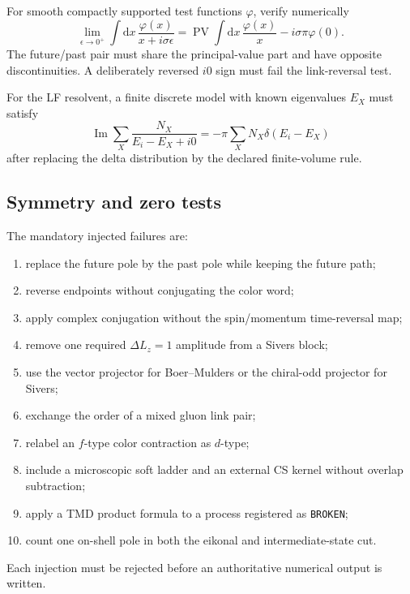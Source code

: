 \documentclass[11pt]{article}
\newcommand{\dd}{\mathrm{d}}
\newcommand{\PV}{\operatorname{PV}}
\begin{document}
For smooth compactly supported test functions \(\varphi\), verify numerically
\begin{equation}
 \lim_{\epsilon\to0^+}
 \int\dd x\,
 \frac{\varphi(x)}{x+i\sigma\epsilon}
 =\PV\int\dd x\,\frac{\varphi(x)}{x}
 -i\sigma\pi\varphi(0).
\label{eq:distribution-numerical-test}
\end{equation}
The future/past pair must share the principal-value part and have opposite
discontinuities.  A deliberately reversed \(i0\) sign must fail the
link-reversal test.

For the LF resolvent, a finite discrete model with known eigenvalues
\(E_X\) must satisfy
\begin{equation}
 \operatorname{Im}
 \sum_X\frac{N_X}{E_i-E_X+i0}
 =-\pi\sum_X N_X\delta(E_i-E_X)
\label{eq:discrete-resolvent-test}
\end{equation}
after replacing the delta distribution by the declared finite-volume rule.

\subsection{Symmetry and zero tests}

The mandatory injected failures are:
\begin{enumerate}
\item replace the future pole by the past pole while keeping the future path;
\item reverse endpoints without conjugating the color word;
\item apply complex conjugation without the spin/momentum time-reversal map;
\item remove one required \(\Delta L_z=1\) amplitude from a Sivers block;
\item use the vector projector for Boer--Mulders or the chiral-odd projector
      for Sivers;
\item exchange the order of a mixed gluon link pair;
\item relabel an \(f\)-type color contraction as \(d\)-type;
\item include a microscopic soft ladder and an external CS kernel without
      overlap subtraction;
\item apply a TMD product formula to a process registered as
      \texttt{BROKEN};
\item count one on-shell pole in both the eikonal and intermediate-state cut.
\end{enumerate}
Each injection must be rejected before an authoritative numerical output is
written.
\end{document}
